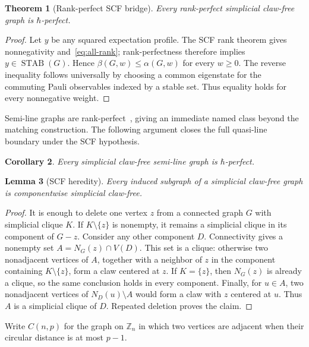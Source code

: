 \documentclass[11pt,a4paper]{article}
\newtheorem{theorem}{Theorem}[section]
\newtheorem{lemma}[theorem]{Lemma}
\newtheorem{corollary}[theorem]{Corollary}
\theoremstyle{remark}
\newcommand{\STAB}{\operatorname{STAB}}
\begin{document}
\begin{theorem}[Rank-perfect SCF bridge]\label{thm:rank-perfect-scf}
Every rank-perfect simplicial claw-free graph is $\hbar$-perfect.
\end{theorem}

\begin{proof}
Let $y$ be any squared expectation profile. The SCF rank theorem gives
nonnegativity and~\eqref{eq:all-rank}; rank-perfectness therefore implies
$y\in\STAB(G)$. Hence $\beta(G,w)\leq\alpha(G,w)$ for every $w\geq0$.
The reverse inequality follows universally by choosing a common eigenstate
for the commuting Pauli observables indexed by a stable set. Thus equality
holds for every nonnegative weight.
\end{proof}

Semi-line graphs are rank-perfect~\cite{oriolo,eosv}, giving an immediate
named class beyond the matching construction. The following argument closes
the full quasi-line boundary under the SCF hypothesis.

\begin{corollary}
Every simplicial claw-free semi-line graph is $\hbar$-perfect.
\end{corollary}

\begin{lemma}[SCF heredity]\label{lem:scf-heredity}
Every induced subgraph of a simplicial claw-free graph is componentwise
simplicial claw-free.
\end{lemma}

\begin{proof}
It is enough to delete one vertex $z$ from a connected graph $G$ with
simplicial clique $K$. If $K\setminus\{z\}$ is nonempty, it remains a
simplicial clique in its component of $G-z$. Consider any other component
$D$. Connectivity gives a nonempty set $A=N_G(z)\cap V(D)$. This set is a
clique: otherwise two nonadjacent vertices of $A$, together with a neighbor
of $z$ in the component containing $K\setminus\{z\}$, form a claw centered at
$z$. If $K=\{z\}$, then $N_G(z)$ is already a clique, so the same conclusion
holds in every component. Finally, for $u\in A$, two nonadjacent vertices of
$N_D(u)\setminus A$ would form a claw with $z$ centered at $u$. Thus $A$ is a
simplicial clique of $D$. Repeated deletion proves the claim.
\end{proof}

Write $C(n,p)$ for the graph on $\mathbb Z_n$ in which two vertices are
adjacent when their circular distance is at most $p-1$.
\end{document}
